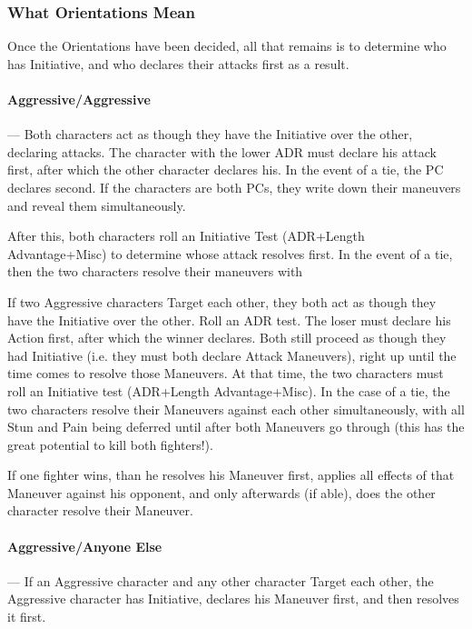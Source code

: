 \documentclass[oneside,11pt,english]{book}
\begin{document}
\subsubsection*{What Orientations Mean}
Once the Orientations have been decided, all that remains is to determine who has Initiative, and who
declares their attacks first as a result.

\paragraph{\label{par:Aggressive/Aggressive}Aggressive/Aggressive}---\quad
Both characters act as though they have the Initiative over the other, declaring attacks. The
character with the lower ADR must declare his attack first, after which the other character
declares his. In the event of a tie, the PC declares second. If the characters are both PCs, they write down their maneuvers and reveal them simultaneously.

After this, both characters roll an Initiative Test (ADR+Length Advantage+Misc) to determine
whose attack resolves first. In the event of a tie, then the two characters resolve their maneuvers
with %

If two Aggressive characters Target each other, they both act as though they have the Initiative
over the other. Roll an ADR test. The loser must declare his Action first, after which the winner
declares. Both still proceed as though they had Initiative (i.e. they must both declare Attack
Maneuvers), right up until the time comes to resolve those Maneuvers. At that time, the two
characters must roll an Initiative test (ADR+Length Advantage+Misc). In the case of a tie, the
two characters resolve their Maneuvers against each other simultaneously, with all Stun and Pain
being deferred until after both Maneuvers go through (this has the great potential to kill both
fighters!). 

If one fighter wins, than he resolves his Maneuver first, applies all effects of that Maneuver against his opponent, and only afterwards (if able), does the other character resolve their Maneuver.
\paragraph{\label{par:Aggressive/Anyone Else}Aggressive/Anyone Else}---\quad
If an Aggressive character and any other character Target each other, the Aggressive character
has Initiative, declares his Maneuver first, and then resolves it first.
\end{document}

